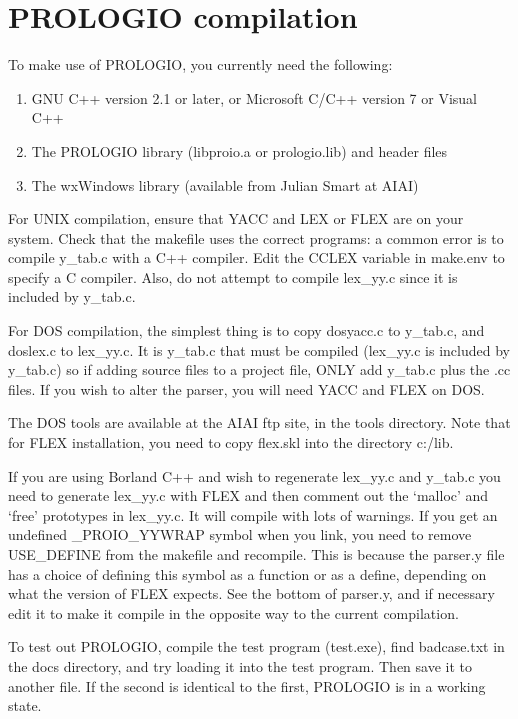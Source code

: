 \chapter{PROLOGIO compilation}
%
\setfooter{\thepage}{}{}{}{}{\thepage}

To make use of PROLOGIO, you currently need the following:

\begin{enumerate}
\item GNU C++ version 2.1 or later, or Microsoft C/C++ version 7 or Visual C++
\item The PROLOGIO library (libproio.a or prologio.lib) and header files
\item The wxWindows library (available from Julian Smart at AIAI)
\end{enumerate}

For UNIX compilation, ensure that YACC and LEX or FLEX are on your system. Check that
the makefile uses the correct programs: a common error is to compile
y\_tab.c with a C++ compiler. Edit the CCLEX variable in make.env
to specify a C compiler. Also, do not attempt to compile lex\_yy.c
since it is included by y\_tab.c.

For DOS compilation, the simplest thing is to copy dosyacc.c to y\_tab.c, and doslex.c to
lex\_yy.c. It is y\_tab.c that must be compiled (lex\_yy.c is included by
y\_tab.c) so if adding source files to a project file, ONLY add y\_tab.c
plus the .cc files. If you wish to alter the parser, you will need YACC
and FLEX on DOS.

The DOS tools are available at the AIAI ftp site, in the tools directory. Note that
for FLEX installation, you need to copy flex.skl into the directory
c:/lib.

If you are using Borland C++ and wish to regenerate lex\_yy.c and y\_tab.c
you need to generate lex\_yy.c with FLEX and then comment out the `malloc' and `free'
prototypes in lex\_yy.c. It will compile with lots of warnings. If you
get an undefined \_PROIO\_YYWRAP symbol when you link, you need to remove
USE\_DEFINE from the makefile and recompile. This is because the parser.y
file has a choice of defining this symbol as a function or as a define,
depending on what the version of FLEX expects. See the bottom of
parser.y, and if necessary edit it to make it compile in the opposite
way to the current compilation.

To test out PROLOGIO, compile the test program (test.exe), find
badcase.txt in the docs directory, and try loading it into the test
program. Then save it to another file. If the second is identical to the
first, PROLOGIO is in a working state.

